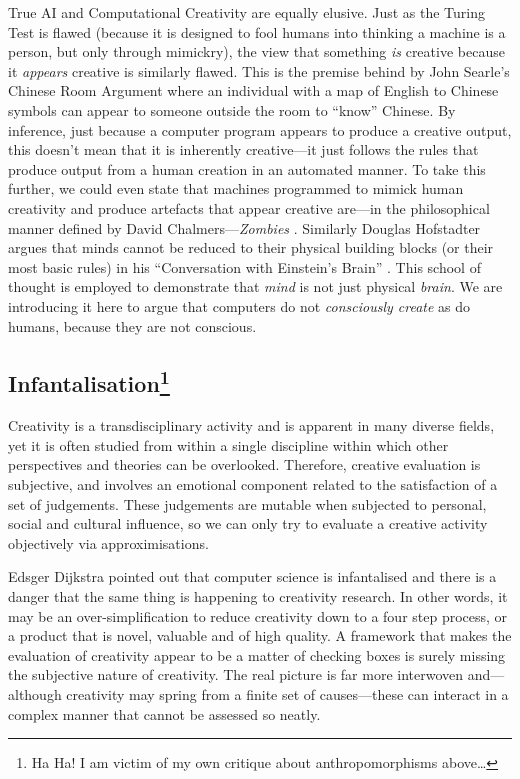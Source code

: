True AI and Computational Creativity are equally elusive. Just as the Turing Test \autocite{Turing1950} is flawed (because it is designed to fool humans into thinking a machine is a person, but only through mimickry), the view that something \textit{is} creative because it \textit{appears} creative is similarly flawed. This is the premise behind by John Searle's Chinese Room Argument \autocite{Searle1980} where an individual with a map of English to Chinese symbols can appear to someone outside the room to ``know'' Chinese. By inference, just because a computer program appears to produce a creative output, this doesn't mean that it is inherently creative---it just follows the rules that produce output from a human creation in an automated manner. To take this further, we could even state that machines programmed to mimick human creativity and produce artefacts that appear creative are---in the philosophical manner defined by David Chalmers---\textit{Zombies} \autocite{Chalmers1996}. Similarly Douglas Hofstadter argues that minds cannot be reduced to their physical building blocks (or their most basic rules) in his ``Conversation with Einstein's Brain'' \autocite{Hofstadter1981}. This school of thought is employed to demonstrate that \textit{mind} is not just physical \textit{brain}. \colorbox{red!30}{We} are introducing it here to argue that computers do not \textit{consciously create} as do humans, because they are not conscious.


\subsection[Infantalisation]{Infantalisation\footnote{Ha Ha! I am victim of my own critique about anthropomorphisms above\ldots}}

Creativity is a transdisciplinary activity and is apparent in many diverse fields, yet it is often studied from within a single discipline within which other perspectives and theories can be overlooked. Therefore, creative evaluation is subjective, and involves an emotional component related to the satisfaction of a set of judgements. These judgements are mutable when subjected to personal, social and cultural influence, so we can only try to evaluate a creative activity objectively via approximisations.

Edsger Dijkstra pointed out that computer science is infantalised \autocite{Dijkstra1988} and there is a danger that the same thing is happening to creativity research. In other words, it may be an over-simplification to reduce creativity down to a four step process, or a product that is novel, valuable and of high quality. A framework that makes the evaluation of creativity appear to be a matter of checking boxes is surely missing the subjective nature of creativity. The real picture is far more interwoven and---although creativity may spring from a finite set of causes---these can interact in a complex manner that cannot be assessed so neatly.

